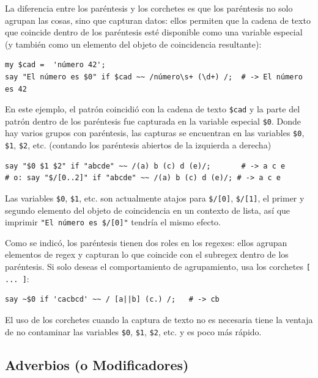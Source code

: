 La diferencia entre los paréntesis y los corchetes es que los
paréntesis no solo agrupan las cosas, sino que capturan datos:
ellos permiten que la cadena de texto que
coincide dentro de los paréntesis esté disponible como una 
variable especial (y también como un elemento del objeto
de coincidencia resultante): 


\begin{lstlisting}
my $cad =  'número 42';
say "El número es $0" if $cad ~~ /número\s+ (\d+) /;  # -> El número es 42
\end{lstlisting}
%

En este ejemplo, el patrón coincidió con la cadena de 
texto \verb|$cad| y la parte del patrón dentro de los 
paréntesis fue capturada en la variable especial \verb|$0|.
Donde hay varios grupos con paréntesis, las capturas se
encuentran en las variables \verb|$0|, \verb|$1|, \verb|$2|, etc.
(contando los paréntesis abiertos de la izquierda a derecha)

\begin{lstlisting}
say "$0 $1 $2" if "abcde" ~~ /(a) b (c) d (e)/;       # -> a c e
# o: say "$/[0..2]" if "abcde" ~~ /(a) b (c) d (e)/; # -> a c e
\end{lstlisting}
%

Las variables \verb|$0|, \verb|$1|, etc. son actualmente atajos
para \verb|$/[0]|, \verb|$/[1]|, el primer y segundo elemento del
objeto de coincidencia en un contexto de lista, así que imprimir
\verb|"El número es $/[0]"| tendría el mismo efecto.

Como se indicó, los paréntesis tienen dos roles en los regexes:
ellos agrupan elementos de regex y capturan lo que coincide 
con el subregex dentro de los paréntesis. Si solo deseas el 
comportamiento de agrupamiento, usa los corchetes
\verb|[ ... ]|:

\begin{lstlisting}
say ~$0 if 'cacbcd' ~~ / [a||b] (c.) /;   # -> cb
\end{lstlisting}
%

El uso de los corchetes cuando la captura de texto no
es necesaria tiene la ventaja de no contaminar las
variables \verb|$0|, \verb|$1|, \verb|$2|, etc. y es 
poco más rápido.

\subsection{Adverbios (o  Modificadores)}
\label{adverb}

